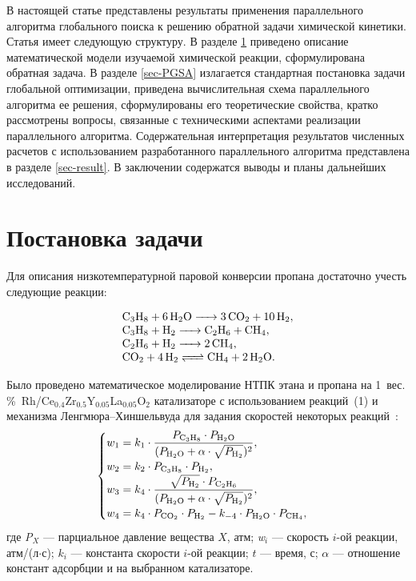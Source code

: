\documentclass{cmi1}
\begin{document}
В настоящей статье представлены результаты применения параллельного алгоритма глобального поиска к решению обратной задачи химической кинетики. Статья имеет следующую структуру. 
В разделе \ref{sec-problem} приведено описание математической модели изучаемой химической реакции, сформулирована обратная задача.
В разделе \ref{sec-PGSA} излагается стандартная постановка задачи глобальной оптимизации, приведена вычислительная схема параллельного алгоритма ее решения, сформулированы его теоретические свойства, кратко рассмотрены вопросы, связанные с техническими аспектами реализации параллельного алгоритма.
Содержательная интерпретация результатов численных расчетов с использованием разработанного параллельного алгоритма представлена в разделе \ref{sec-result}.
В заключении содержатся выводы и планы дальнейших исследований.

\section{Постановка задачи}
\label{sec-problem}

Для описания низкотемпературной паровой конверсии пропана достаточно учесть следующие реакции:

\begin{equation}\label{eq1}
\begin{array}{l}
\ce{C3H8 + 6H2O -> 3CO2 + 10H2}, \\
\ce{C3H8 + H2 -> C2H6 + CH4}, \\
\ce{C2H6 + H2 -> 2CH4}, \\
\ce{CO2 + 4H2 <=> CH4 + 2H2O}. \\
\end{array}
\end{equation}

Было проведено математическое моделирование НТПК этана и пропана на 1~вес.\,\%~Rh/Ce$_{0.4}$Zr$_{0.5}$Y$_{0.05}$La$_{0.05}$O$_{2}$ катализаторе с использованием реакций~(1) и механизма Ленгмюра--Хиншельвуда для задания скоростей некоторых реакций~:
\begin{equation}
\begin{cases}
\displaystyle w_{1} = k_{1} \cdot \frac{P_{\ce{C3H8}}\cdot P_{\ce{H2O}}}{(P_{\ce{H2O}}+\alpha\cdot\sqrt{P_{\ce{H2}}})^2}, \\
\displaystyle w_{2} = k_{2} \cdot P_{\ce{C3H8}} \cdot P_{\ce{H2}}, \\
\displaystyle w_{3} = k_{4}\cdot \frac{\sqrt{P_{\ce{H2}}}\cdot P_{\ce{C2H6}}}{(P_{\ce{H2O}}+\alpha\cdot\sqrt{P_{\ce{H2}}})^2},\\
\displaystyle w_{4} = k_{4}\cdot P_{\ce{CO2}}\cdot P_{\ce{H2}}-k_{-4}\cdot P_{\ce{H2O}}\cdot P_{\ce{CH4}},\\
\end{cases}
\end{equation}
где \textit{P}$_{X}$ --- парциальное давление вещества $X$, атм; \textit{w}$_{i}$ --- скорость $i$-ой реакции, атм/(л$\cdot$с); $k_{i}$ --- константа скорости $i$-ой реакции; $t$ --- время, с; $\alpha$ --- отношение констант адсорбции  и  на выбранном катализаторе.
\end{document}
